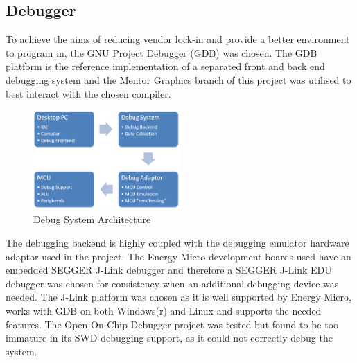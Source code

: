 \subsection{Debugger}
To achieve the aims of reducing vendor lock-in and provide a better environment to program in, the
GNU Project Debugger (GDB) was chosen. The GDB platform is the reference implementation of a
separated front and back end debugging system and the Mentor Graphics branch of this project was
utilised to best interact with the chosen compiler.

\begin{figure}
  \vspace{-10pt}
  \begin{center}
    \includegraphics[width=0.5\textwidth, keepaspectratio=true]{images/debug_system.png}
  \end{center}
  \caption[Debug System Architecture]{Debug System Architecture}
  \vspace{-10pt}
\end{figure}

The debugging backend is highly coupled with the debugging emulator hardware adaptor used in the
project. The Energy Micro development boards used have an embedded SEGGER J-Link debugger
and therefore a SEGGER J-Link EDU debugger was chosen for consistency when an additional
debugging device was needed. The J-Link platform was chosen as it is well supported by Energy
Micro, works with GDB on both Windows(r) and Linux and supports the needed features. The Open
On-Chip Debugger project was tested but found to be too immature in its SWD debugging support,
as it could not correctly debug the system.


